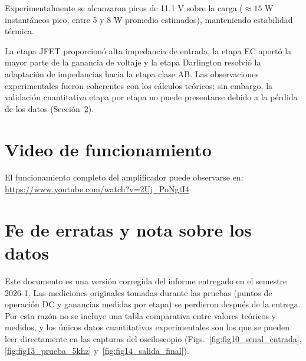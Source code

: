 \documentclass[10pt,twocolumn,letterpaper]{article}
\begin{document}
Experimentalmente se alcanzaron picos de 11.1 V sobre la carga (\(\approx 15\) W instantáneos pico, entre 5 y 8 W promedio estimados), manteniendo estabilidad térmica.

La etapa JFET proporcionó alta impedancia de entrada, la etapa EC aportó la mayor parte de la ganancia de voltaje y la etapa Darlington resolvió la adaptación de impedancias hacia la etapa clase AB. Las observaciones experimentales fueron coherentes con los cálculos teóricos; sin embargo, la validación cuantitativa etapa por etapa no puede presentarse debido a la pérdida de los datos (Sección~\ref{sec:erratas}).

\section{Video de funcionamiento}
El funcionamiento completo del amplificador puede observarse en:
\url{https://www.youtube.com/watch?v=2Uj_PoNgtI4}

\section{Fe de erratas y nota sobre los datos}\label{sec:erratas}
Este documento es una versión corregida del informe entregado en el semestre 2026-1. Las mediciones originales tomadas durante las pruebas (puntos de operación DC y ganancias medidas por etapa) se perdieron después de la entrega. Por esta razón no se incluye una tabla comparativa entre valores teóricos y medidos, y los únicos datos cuantitativos experimentales son los que se pueden leer directamente en las capturas del osciloscopio (Figs.~\ref{fig:fig10_senal_entrada}, \ref{fig:fig13_prueba_5khz} y~\ref{fig:fig14_salida_final}).
\end{document}
